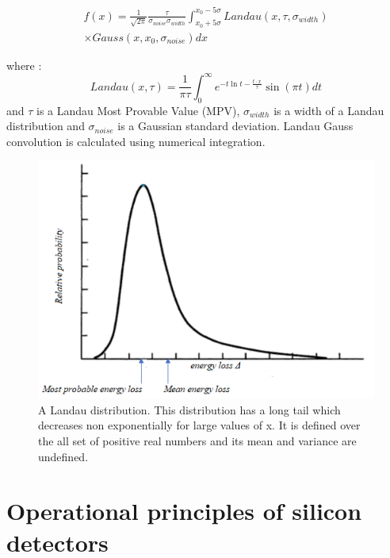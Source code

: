 \begin{equation}
    \begin{split}
    f(x) = \frac{1}{\sqrt{2 \pi}} \frac{\tau}{\sigma_{noise} \sigma_{width}} \int_{x_0+5\sigma}^{x_0-5\sigma} Landau(x, \tau, \sigma_{width}) \\ \times Gauss (x, x_0,\sigma_{noise}) dx
    \end{split}
\end{equation}

where :
\begin{equation}
    Landau(x,\tau) =  \frac{1}{\pi \tau} \int_{0}^{\infty} e^{-t \ln t - \frac{t \cdot x}{\tau}} \sin{\left(\pi t\right)} dt
\end{equation}
and $\tau$ is a Landau Most Provable Value (MPV), $\sigma_{width}$ is a width of a Landau distribution and $\sigma_{noise}$ is a Gaussian standard deviation. Landau Gauss convolution is calculated using numerical integration. 


\begin{figure}[h]
\centering
\includegraphics{figures/landau-distribution.png}
\caption{A Landau distribution. This distribution has a long tail which decreases  non exponentially for large values of x. It is defined over the all set of positive real numbers and its mean and variance are undefined.  
\label{fig:landau_distribution}}
\end{figure}

\section{Operational principles of silicon detectors}


